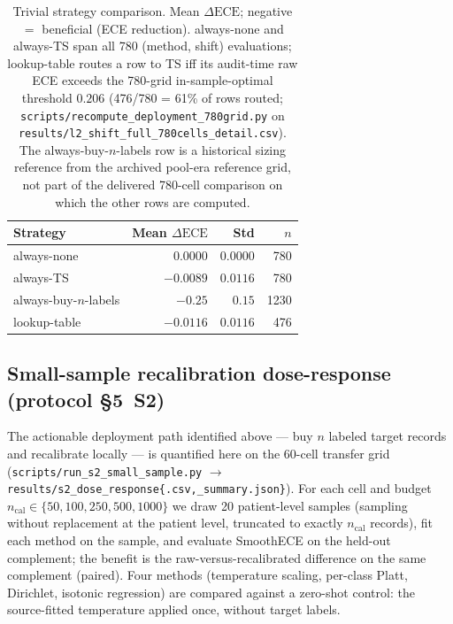 \documentclass[review,12pt,nonatbib]{elsarticle}
\begin{document}
\begin{table}[t]
\centering
\caption{Trivial strategy comparison. Mean $\Delta\text{ECE}$; negative $=$
beneficial (ECE reduction). always-none and always-TS span all 780
(method, shift) evaluations; lookup-table routes a row to TS iff its
audit-time raw ECE exceeds the 780-grid in-sample-optimal threshold
$0.206$ (476/780 = 61\% of rows routed;
\texttt{scripts/recompute\_deployment\_780grid.py} on
\texttt{results/l2\_shift\_full\_780cells\_detail.csv}). The
always-buy-$n$-labels row is a historical sizing reference from the
archived pool-era reference grid, not part of the delivered 780-cell
comparison on which the other rows are computed.}
\label{tab:trivial}
\begin{tabular}{lrrr}
\toprule
Strategy & Mean $\Delta\text{ECE}$ & Std & $n$ \\
\midrule
always-none            & $\phantom{-}0.0000$  & $0.0000$ & 780 \\
always-TS              & $-0.0089$            & $0.0116$ & 780  \\
always-buy-$n$-labels  & $-0.25$              & $0.15$ & 1230 \\
lookup-table           & $-0.0116$            & $0.0116$ & 476  \\
\bottomrule
\end{tabular}
\end{table}

\subsection{Small-sample recalibration dose-response (protocol \S5~S2)}
\label{sec:s2}
The actionable deployment path identified above --- buy $n$ labeled
target records and recalibrate locally --- is quantified here on the
60-cell transfer grid (\texttt{scripts/run\_s2\_small\_sample.py}
$\rightarrow$ \texttt{results/s2\_dose\_response\{.csv,\_summary.json\}}).
For each cell and budget $n_{\text{cal}}\in\{50,100,250,500,1000\}$ we
draw 20 patient-level samples (sampling without replacement at the
patient level, truncated to exactly $n_{\text{cal}}$ records), fit each
method on the sample, and evaluate SmoothECE on the held-out complement;
the benefit is the raw-versus-recalibrated difference on the same
complement (paired). Four methods (temperature scaling, per-class
Platt, Dirichlet, isotonic regression) are compared against a zero-shot
control: the source-fitted temperature applied once, without target
labels.
\end{document}
